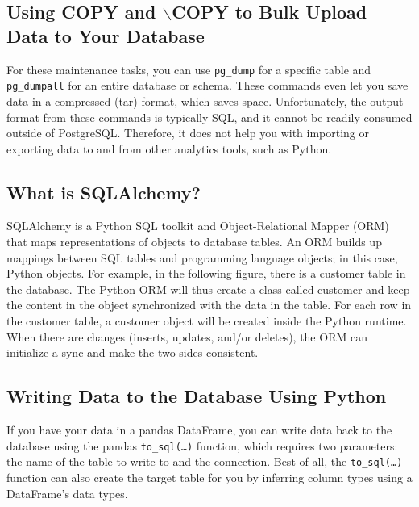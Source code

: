 \subsection{Using COPY and $\backslash$COPY to Bulk Upload Data to Your Database}
\begin{tcolorbox}[title=Note]
    For these maintenance tasks, you can use \verb|pg_dump| for a specific table and \verb|pg_dumpall| for an entire database or schema. These commands even let you save data in a compressed (tar) format, which saves space. Unfortunately, the output format from these commands is typically SQL, and it cannot be readily consumed outside of PostgreSQL. Therefore, it does not help you with importing or exporting data to and from other analytics tools, such as Python.
\end{tcolorbox}

\subsection{What is SQLAlchemy?}
SQLAlchemy is a Python SQL toolkit and Object-Relational Mapper (ORM) that maps representations of objects to database tables. An ORM builds up mappings between SQL tables and programming language objects; in this case, Python objects. For example, in the following figure, there is a customer table in the database. The Python ORM will thus create a class called customer and keep the content in the object synchronized with the data in the table. For each row in the customer table, a customer object will be created inside the Python runtime. When there are changes (inserts, updates, and/or deletes), the ORM can initialize a sync and make the two sides consistent.

\subsection{Writing Data to the Database Using Python}
If you have your data in a pandas DataFrame, you can write data back to the database using the pandas \verb|to_sql(…)| function, which requires two parameters: the name of the table to write to and the connection. Best of all, the \verb|to_sql(…)| function can also create the target table for you by inferring column types using a DataFrame's data types. 